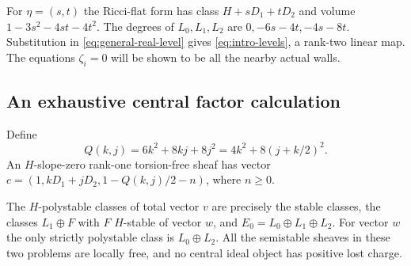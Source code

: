 For $\eta=(s,t)$ the Ricci-flat form has class
$H+sD_1+tD_2$ and volume $1-3s^2-4st-4t^2$.
The degrees of $L_0,L_1,L_2$ are
$0,-6s-4t,-4s-8t$. Substitution in
\eqref{eq:general-real-level} gives
\eqref{eq:intro-levels}, a rank-two linear map. The equations
$\zeta_i=0$ will be shown to be all the nearby actual walls.

\subsection{An exhaustive central factor calculation}
Define
\[
 Q(k,j)=6k^2+8kj+8j^2=4k^2+8(j+k/2)^2.
\]
An $H$-slope-zero rank-one torsion-free sheaf has vector
$c=(1,kD_1+jD_2,1-Q(k,j)/2-n)$, where $n\ge0$.

\begin{lemma}\label{lem:interacting-factor-list}
The $H$-polystable classes of total vector $v$ are precisely
the stable classes, the classes $L_1\oplus F$ with $F$
$H$-stable of vector $w$, and $E_0=L_0\oplus L_1\oplus L_2$.
For vector $w$ the only strictly polystable class is
$L_0\oplus L_2$. All the semistable sheaves in these two
problems are locally free, and no central ideal object has
positive lost charge.
\end{lemma}

